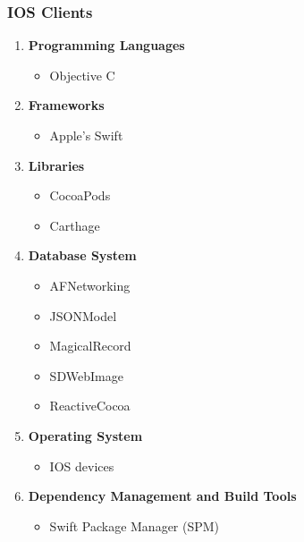\documentclass{article}
\begin{document}
		\subsubsection{IOS Clients}
		\begin{enumerate}
		 \item \textbf{Programming Languages}
			\begin{itemize}
				\item Objective C
			\end{itemize}
		\item \textbf{Frameworks}
			\begin{itemize}
				\item Apple's Swift
			\end{itemize}
		\item \textbf{Libraries}
			\begin{itemize}
				\item CocoaPods
				\item Carthage
			\end{itemize}
		\item \textbf{Database System}
			\begin{itemize}
 				\item AFNetworking
				\item JSONModel
				\item MagicalRecord
				\item SDWebImage
				\item ReactiveCocoa
			\end{itemize}
		\item \textbf{Operating System}
			\begin{itemize}
 				\item IOS devices
			\end{itemize}
		\item \textbf{Dependency Management and Build Tools}
			\begin{itemize}
				\item Swift Package Manager (SPM)
			\end{itemize}
		\end{enumerate}
	
\end{document}
